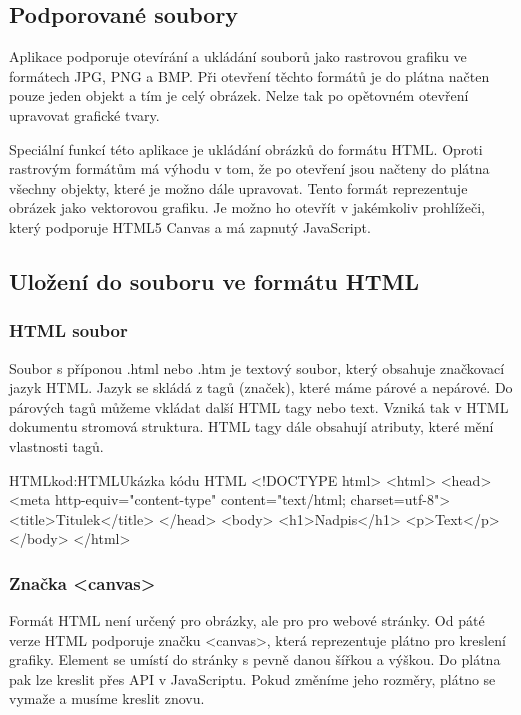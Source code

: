 \documentclass[
  field=inf,
  biblatex,
  glossaries,
  index
]{kidiplom}
\begin{document}
\subsection{Podporované soubory}

Aplikace podporuje otevírání a ukládání souborů jako rastrovou grafiku ve formátech JPG, PNG a BMP. Při otevření těchto formátů je do plátna načten pouze jeden objekt a tím je celý obrázek. Nelze tak po opětovném otevření upravovat grafické tvary. 

Speciální funkcí této aplikace je ukládání obrázků do formátu HTML. Oproti rastrovým formátům má výhodu v tom, že po otevření jsou načteny do plátna všechny objekty, které je možno dále upravovat. Tento formát reprezentuje obrázek jako vektorovou grafiku. Je možno ho otevřít v jakémkoliv prohlížeči, který podporuje HTML5 Canvas a má zapnutý JavaScript.

\subsection{Uložení do souboru ve formátu HTML}

\subsubsection{HTML soubor}

Soubor s příponou .html nebo .htm je textový soubor, který obsahuje značkovací jazyk HTML. Jazyk se skládá z tagů (značek), které máme párové a nepárové. Do párových tagů můžeme vkládat další HTML tagy nebo text. Vzniká tak v HTML dokumentu stromová struktura. HTML tagy dále obsahují atributy, které mění vlastnosti tagů.

\begin{kicode}{HTML}{kod:HTML}{Ukázka kódu HTML}
<!DOCTYPE html>
<html>
  <head>
  <meta http-equiv="content-type" content="text/html; charset=utf-8">
  <title>Titulek</title>
  </head>
  <body>
    <h1>Nadpis</h1>
    <p>Text</p>
  </body>
</html>
\end{kicode}

\subsubsection{Značka <canvas>}

Formát HTML není určený pro obrázky, ale pro pro webové stránky. Od páté verze HTML podporuje značku <canvas>, která reprezentuje plátno pro kreslení grafiky. Element se umístí do stránky s pevně danou šířkou a výškou. Do plátna pak lze kreslit přes API v JavaScriptu. Pokud změníme jeho rozměry, plátno se vymaže a musíme kreslit znovu.
\end{document}
